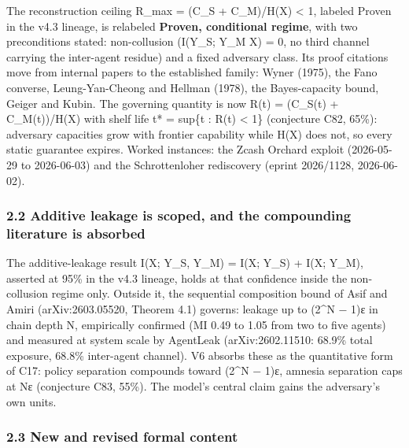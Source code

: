 \documentclass[
]{article}
\begin{document}
The reconstruction ceiling R\_max = (C\_S + C\_M)/H(X) \textless{} 1,
labeled Proven in the v4.3 lineage, is relabeled \textbf{Proven,
conditional regime}, with two preconditions stated: non-collusion
(I(Y\_S; Y\_M \textbar{} X) = 0, no third channel carrying the
inter-agent residue) and a fixed adversary class. Its proof citations
move from internal papers to the established family: Wyner (1975), the
Fano converse, Leung-Yan-Cheong and Hellman (1978), the Bayes-capacity
bound, Geiger and Kubin. The governing quantity is now R(t) = (C\_S(t) +
C\_M(t))/H(X) with shelf life t* = sup\{t : R(t) \textless{} 1\}
(conjecture C82, 65\%): adversary capacities grow with frontier
capability while H(X) does not, so every static guarantee expires.
Worked instances: the Zcash Orchard exploit (2026-05-29 to 2026-06-03)
and the Schrottenloher rediscovery (eprint 2026/1128, 2026-06-02).

\subsubsection{2.2 Additive leakage is scoped, and the compounding
literature is
absorbed}\label{additive-leakage-is-scoped-and-the-compounding-literature-is-absorbed}

The additive-leakage result I(X; Y\_S, Y\_M) = I(X; Y\_S) + I(X; Y\_M),
asserted at 95\% in the v4.3 lineage, holds at that confidence inside
the non-collusion regime only. Outside it, the sequential composition
bound of Asif and Amiri (arXiv:2603.05520, Theorem 4.1) governs: leakage
up to (2\^{}N − 1)ε in chain depth N, empirically confirmed (MI 0.49 to
1.05 from two to five agents) and measured at system scale by AgentLeak
(arXiv:2602.11510: 68.9\% total exposure, 68.8\% inter-agent channel).
V6 absorbs these as the quantitative form of C17: policy separation
compounds toward (2\^{}N − 1)ε, amnesia separation caps at Nε
(conjecture C83, 55\%). The model's central claim gains the adversary's
own units.

\subsubsection{2.3 New and revised formal
content}\label{new-and-revised-formal-content}
\end{document}

